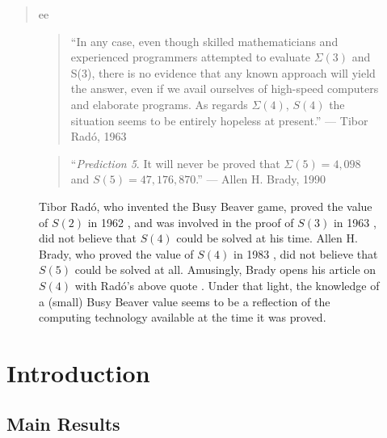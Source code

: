 \documentclass[a4paper,british]{article}
\theoremstyle{definition} %
\numberwithin{equation}{section}
\theoremstyle{definition} %
\newcommand{\BBtheFifth}{47{,}176{,}870}
\newcommand{\SigmaTheFifth}{4{,}098}
\newcommand{\radofull}{Tibor Rad\'o\xspace}
\newcommand{\rado}{Rad\'o\xspace}
\begin{document}
\date{}
\maketitle

\begin{abstract}
    ee
\end{abstract}


\setcounter{tocdepth}{2}
\tableofcontents
\newpage

\begin{center}

\end{center}



\begin{figure}
    \begin{quote}
        ``In any case, even though skilled mathematicians and experienced programmers attempted to evaluate $\Sigma(3)$ and S(3), there is no evidence that any known approach will yield the answer, even if we avail ourselves of high-speed computers and elaborate programs. As regards $\Sigma(4)$, $S(4)$ the situation seems to be entirely hopeless at present.'' --- \radofull, 1963 \cite{Rado_1963}
    \end{quote}
    \begin{quote}
        ``\textit{Prediction 5}. It will never be proved that $\Sigma(5) = \SigmaTheFifth$ and $S(5) = \BBtheFifth$.'' --- Allen H. Brady, 1990 \cite{BradyMeaningOfLife}
    \end{quote}
    \caption{\radofull, who invented the Busy Beaver game, proved the value of $S(2)$ in 1962 \cite{Rado_1962}, and was involved in the proof of $S(3)$ in 1963 \cite{Lin1963}, did not believe that $S(4)$ could be solved at his time. Allen H. Brady, who proved the value of $S(4)$ in 1983 \cite{Brady83}, did not believe that $S(5)$ could be solved at all. Amusingly, Brady opens his article on $S(4)$ with \rado's above quote \cite{Brady83}. Under that light, the knowledge of a (small) Busy Beaver value seems to be a reflection of the computing technology available at the time it was proved.}
\end{figure}

\section{Introduction}

\subsection{Main Results}
\end{document}
